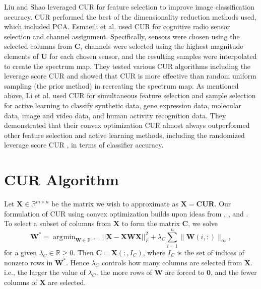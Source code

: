 \documentclass[12pt]{article}
\DeclareMathOperator*{\argmin}{\arg\!\min}
\begin{document}
Liu and Shao \cite{liu_shao_2010} leveraged CUR for feature selection to improve image classification accuracy.  CUR performed the best of the dimensionality reduction methods used, which included PCA. Esmaeili et al. \cite{esmaeili_etal_2021} used CUR for cognitive radio sensor selection and channel assignment.  Specifically, sensors were chosen using the selected columns from $\mathbf{C}$, channels were selected using the highest magnitude elements of $\mathbf{U}$ for each chosen sensor, and the resulting samples were interpolated to create the spectrum map.  They tested various CUR algorithms including the leverage score CUR \cite{mahoney_drineas_2009} and showed that CUR is more effective than random uniform sampling (the prior method) in recreating the spectrum map.  As mentioned above, Li et al. \cite{li_etal_2019} used CUR for simultaneous feature selection and sample selection for active learning to classify synthetic data, gene expression data, molecular data, image and video data, and human activity recognition data.  They demonstrated that their convex optimization CUR almost always outperformed other feature selection and active learning methods, including the randomized leverage score CUR \cite{mahoney_drineas_2009}, in terms of classifier accuracy. 


\section{CUR Algorithm}
\label{sec:cur_alg}

Let $\mathbf{X} \in \mathbb{R}^{m \times n}$ be the matrix we wish to approximate as $\mathbf{X} = \mathbf{CUR}$. Our formulation of CUR using convex optimization builds upon ideas from  \cite{bien_xu_mahoney_2010}, \cite{mahoney_drineas_2009}, and \cite{mairal_etal_2011}. To select a subset of columns from $\mathbf{X}$ to form the matrix $\mathbf{C}$, we solve 
\begin{equation}
\label{eqn:C}
\mathbf{W^*} = \argmin_{\mathbf{W} \in \mathbb{R}^{n \times m}} ||\mathbf{X-XWX}||_F^2 + \lambda_C \sum_{i=1}^n \| \mathbf{W}(i,:) \|_{\infty},
\end{equation}
for a given $\lambda_C \in \mathbb{R} \geq 0$.  Then $\mathbf{C} = \mathbf{X}(:, I_C)$, where $I_C$ is the set of indices of nonzero rows in $\mathbf{W^*}$.  Hence $\lambda_C$ controls how many columns are selected from $\mathbf{X}$. i.e., the larger the value of $\lambda_C$, the more rows of $\mathbf{W}$ are forced to $\mathbf{0}$, and the fewer columns of $\mathbf{X}$ are selected.
\end{document}
